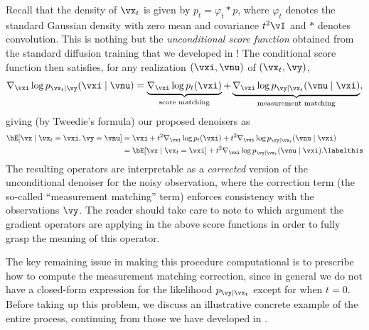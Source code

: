 \documentclass[../../book-main.tex]{subfiles}
\begin{document}
Recall that the density of $\vx_t$ is 
given by $p_t = \varphi_{t} \ast p$, where $\varphi_{t}$ denotes the standard
Gaussian density with zero mean and covariance $t^2 \vI$ and $\ast$ denotes
convolution. This is nothing but the \textit{unconditional score function}
obtained from the standard diffusion training that we developed in
!
The conditional score function then satisfies, for any realization $(\vxi,
\vnu)$ of $(\vx_t, \vy)$,
\begin{equation}
  \nabla_{\vxi} \log p_{\vx_t \mid \vy}(\vxi\mid \vnu)
  =
  \underbrace{\nabla_{\vxi} \log p_t(\vxi)}_{\text{score matching}}
  +
  \underbrace{\nabla_{\vxi} \log p_{\vy \mid \vx_t}(\vnu \mid \vxi)}_{\text{measurement matching}},
  \label{eqn:conditional-denoising-score}
\end{equation}
giving (by Tweedie's formula) our proposed denoisers as
\begin{align*}
  \bE[ \vx \mid \vx_t=\vxi, \vy=\vnu]
  &=
  \vxi + t^2 \nabla_{\vxi}\log p_t(\vxi) + t^2 \nabla_{\vxi}\log p_{\vy \mid
  \vx_t}(\vnu \mid \vxi)
  \\
  &=
  \bE[\vx \mid \vx_t=\vxi] + t^2 \nabla_{\vxi}\log p_{\vy \mid \vx_t}(\vnu\mid
  \vxi).
  \labelthis \label{eq:posterior-sampling-denoiser-decomposition}
\end{align*}
The resulting operators are interpretable as a \textit{corrected} version of the
unconditional denoiser for the noisy observation, where the correction term (the
so-called ``measurement matching'' term) enforces consistency with the
observations $\vy$. The reader should take care to note to which argument the
gradient operators are applying in the above score functions in order to fully
grasp the meaning of this operator.
 

The key remaining issue in making this procedure computational is to prescribe
how to compute the measurement matching correction, since in general we do not
have a closed-form
expression for the likelihood $p_{\vy \mid \vx_t}$ except for when $t
= 0$. Before taking up this problem, we discuss an illustrative concrete example
of the entire process, continuing from those we have developed in
.
\end{document}
